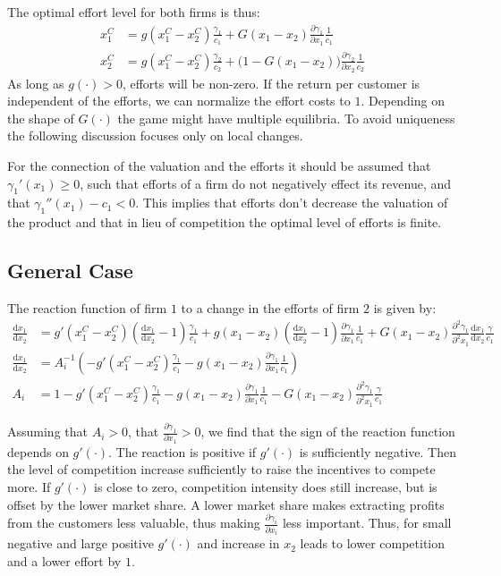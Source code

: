 \documentclass[a4paper, 11pt]{article}
\renewcommand{\d}{\text{d}}
\begin{document}
The optimal effort level for both firms is thus:
\begin{align}
x_1^C &= g(x_1^C-x_2^C)\frac{\gamma_1}{c_1} + G(x_1-x_2)\frac{\partial \gamma_1}{\partial x_1}\frac{1}{c_1}\\
x_2^C &= g(x_1^C-x_2^C)\frac{\gamma_2}{c_2} + \big(1-G(x_1-x_2)\big)\frac{\partial \gamma_2}{\partial x_2}\frac{1}{c_2}
\end{align}
As long as $g(\cdot)>0$, efforts will be non-zero. If the return per customer is independent of the efforts, we can normalize the effort costs to $1$. Depending on the shape of $G(\cdot)$ the game might have multiple equilibria. To avoid uniqueness the following discussion focuses only on local changes. 

For the connection of the valuation and the efforts it should be assumed that $\gamma_1'(x_1)\geq 0$, such that efforts of a firm do not negatively effect its revenue, and that $\gamma_1''(x_1) - c_1<0$. This implies that efforts don't decrease the valuation of the product and that in lieu of competition the optimal level of efforts is finite.

\subsection{General Case}
The reaction function of firm $1$ to a change in the efforts of firm $2$ is given by:
\begin{align}
\frac{\d x_1}{\d x_2} &= g'(x_1^C-x_2^C)\left(\frac{\d x_1}{\d x_2}-1\right)\frac{\gamma_1}{c_1} + g(x_1-x_2)\left(\frac{\d x_1}{\d x_2}-1\right)\frac{\partial \gamma_1}{\partial x_1}\frac{1}{c_1} + G(x_1-x_2)\frac{\partial^2 \gamma_1}{\partial^2 x_1}\frac{\d x_1}{\d x_2}\frac{\gamma}{c_1}\\
\frac{\d x_1}{\d x_2} &= A_i^{-1} \left(-g'(x_1^C-x_2^C)\frac{\gamma_1}{c_1} - g(x_1-x_2)\frac{\partial \gamma_1}{\partial x_1}\frac{1}{c_1}\right)\\
A_i &= 1 - g'(x_1^C-x_2^C)\frac{\gamma_1}{c_1}-g(x_1-x_2)\frac{\partial \gamma_1}{\partial x_1}\frac{1}{c_1}-G(x_1-x_2)\frac{\partial^2 \gamma_1}{\partial^2 x_1}\frac{\gamma}{c_1}
\end{align}

Assuming that $A_i>0$, that $\frac{\partial \gamma_1}{\partial x_1}>0$, we find that the sign of the reaction function depends on $g'(\cdot)$. The reaction is positive if $g'(\cdot)$ is sufficiently negative. Then the level of competition increase sufficiently to raise the incentives to compete more. If $g'(\cdot)$ is close to zero, competition intensity does still increase, but is offset by the lower market share. A lower market share makes extracting profits from the customers less valuable, thus making $\frac{\partial \gamma_i}{\partial x_i}$ less important. Thus, for small negative and large positive $g'(\cdot)$ and increase in $x_2$ leads to lower competition and a lower effort by $1$. 
\end{document}
